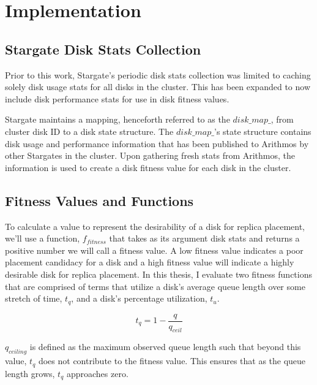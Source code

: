 \documentclass[12pt]{article}
\begin{document}

\section{Implementation}

  \subsection{Stargate Disk Stats Collection}

  Prior to this work, Stargate's periodic disk stats collection was limited to
  caching solely disk usage stats for all disks in the cluster.  This has been
  expanded to now include disk performance stats for use in disk fitness
  values.

  Stargate maintains a mapping, henceforth referred to as the $disk\_map\_$,
  from cluster disk ID to a disk state structure. The $disk\_map\_$'s state
  structure contains disk usage and performance information that has been
  published to Arithmos by other Stargates in the cluster. Upon gathering fresh
  stats from Arithmos, the information is used to create a disk fitness value
  for each disk in the cluster.

  \subsection{Fitness Values and Functions}

  To calculate a value to represent the desirability of a disk for replica
  placement, we'll use a function, $f_{fitness}$ that takes as its argument
  disk stats and returns a positive number we will call a fitness value. A low
  fitness value indicates a poor placement candidacy for a disk and a high
  fitness value will indicate a highly desirable disk for replica placement. In
  this thesis, I evaluate two fitness functions that are comprised of terms
  that utilize a disk's average queue length over some stretch of time,
  $t_{q}$, and a disk's percentage utilization, $t_{u}$.

  \begin{equation}
    t_{q} = 1 - \frac{q}{q_{ceil}}
  \end{equation}

  $q_{ceiling}$ is defined as the maximum observed queue length such that
  beyond this value, $t_{q}$ does not contribute to the fitness
  value. This ensures that as the queue length grows, $t_{q}$
  approaches zero. 
\end{document}
